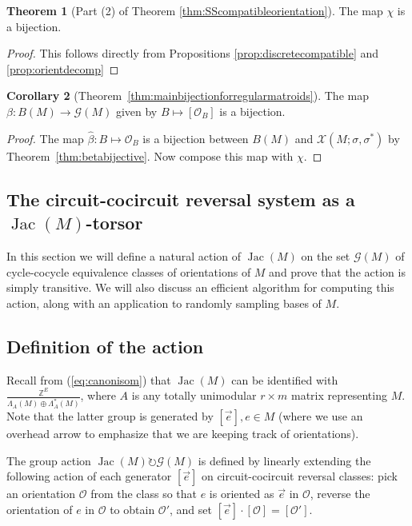 \documentclass[12pt]{amsart}
\numberwithin{equation}{section}
\theoremstyle{definition}
\newtheorem{theorem}{Theorem}[subsection]
\newtheorem{corollary}[theorem]{Corollary}
\newcommand{\Jac}{\operatorname{Jac}}
\begin{document}
\begin{theorem} [Part (2) of Theorem \ref{thm:SScompatibleorientation}] \label{thm:chibijective}
The map $\chi$ is a bijection.
\end{theorem}

\begin{proof}
This follows directly from Propositions \ref{prop:discretecompatible} and \ref{prop:orientdecomp}
\end{proof}

\begin{corollary} [Theorem~\ref{thm:mainbijectionforregularmatroids}]
The map $\beta:B(M)\rightarrow\mathcal{G}(M)$ given by $B\mapsto [\mathcal{O}_B]$ is a bijection.
\end{corollary}

\begin{proof}
The map $\hat{\beta}:B\mapsto \mathcal{O}_B$ is a bijection between $B(M)$ and $\mathcal{X}(M;\sigma,\sigma^*)$ by Theorem~\ref{thm:betabijective}. Now compose this map with $\chi$.
\end{proof}

\subsection{The circuit-cocircuit reversal system as a $\Jac(M)$-torsor}
\label{sec:Torsor}

In this section we will define a natural action of $\Jac(M)$ on the set ${\mathcal G}(M)$ of cycle-cocycle equivalence classes of orientations of $M$ and prove that the action is simply transitive. We will also discuss an efficient algorithm for computing this action, along with an application to randomly sampling bases of $M$.

\subsection{Definition of the action}

Recall from (\ref{eq:canonisom}) that $\Jac(M)$ can be identified with $\frac{\mathbb{Z}^E}{\Lambda_A(M)\oplus \Lambda_A^*(M)}$, where $A$ is any totally unimodular $r \times m$ matrix representing $M$. Note that the latter group is generated by $[\overrightarrow{e}],e\in M$ (where we use an overhead arrow to emphasize that we are keeping track of orientations). 

The group action $\Jac(M)\circlearrowright\mathcal{G}(M)$ is defined by linearly extending the following action of each generator $[\overrightarrow{e}]$ on circuit-cocircuit reversal classes: pick an orientation $\mathcal{O}$ from the class so that $e$ is oriented as $\overrightarrow{e}$ in $\mathcal{O}$, reverse the orientation of $e$ in $\mathcal{O}$ to obtain $\mathcal{O}'$, and set $[\overrightarrow{e}]\cdot[\mathcal{O}]=[\mathcal{O}']$.
\end{document}
